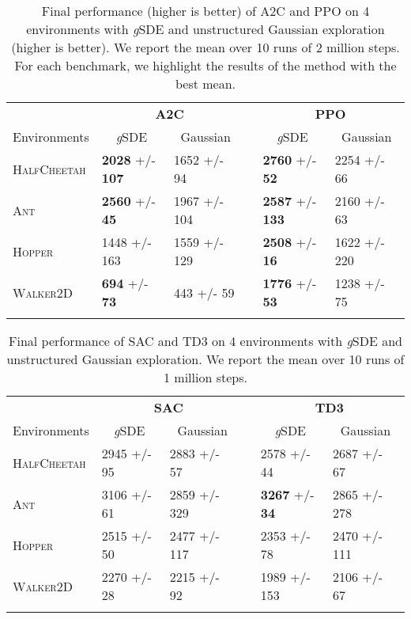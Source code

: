 \documentclass{article}
\newcommand{\ourSDE}{\textit{g}\textsc{SDE}\xspace}
\newcommand{\aac}{\textsc{A2C}\xspace}
\newcommand{\ppo}{\textsc{PPO}\xspace}
\newcommand{\sac}{\textsc{SAC}\xspace}
\newcommand{\tddd}{\textsc{TD3}\xspace}
\newcommand{\hc}{\textsc{HalfCheetah}\xspace}
\newcommand{\hopper}{\textsc{Hopper}\xspace}
\newcommand{\ant}{\textsc{Ant}\xspace}
\newcommand{\walker}{\textsc{Walker2D}\xspace}
\begin{document}
\begin{table}[h!]
\renewcommand{\arraystretch}{1.2}
\centering
\begin{tabular}{@{}l ll c ll@{}}

\toprule
 & \multicolumn{2}{c}{\textbf{\aac}} & \phantom{abc} & \multicolumn{2}{c}{\textbf{\ppo}} \\
 \cmidrule{2-3} \cmidrule{5-6}

 Environments & \multicolumn{1}{c}{\ourSDE} & \multicolumn{1}{c}{Gaussian} && \multicolumn{1}{c}{\ourSDE} &  \multicolumn{1}{c}{Gaussian} \\ \midrule
 \hc & \textbf{2028} +/- \textbf{107} & 1652 +/- 94 && \textbf{2760} +/- \textbf{52} & 2254 +/- 66 \\
 \ant & \textbf{2560} +/- \textbf{45} & 1967 +/- 104 && \textbf{2587} +/- \textbf{133} & 2160 +/- 63 \\
 \hopper & 1448 +/- 163 & 1559 +/- 129 && \textbf{2508} +/- \textbf{16} & 1622 +/- 220 \\
 \walker & \textbf{694} +/- \textbf{73} & 443 +/- 59 && \textbf{1776} +/- \textbf{53} & 1238 +/- 75 \\

\bottomrule \\
\end{tabular}

\caption{Final performance (higher is better) of \aac and \ppo on 4 environments with \ourSDE and unstructured Gaussian exploration (higher is better). We report the mean over 10 runs of 2 million steps.
For each benchmark, we highlight the results of the method with the best mean.
}
\label{tab:res-bullet-onpolicy}
\end{table}

\begin{table}[h!]
\renewcommand{\arraystretch}{1.2}
\centering
\begin{tabular}{@{}l ll c ll@{}}

\toprule
 & \multicolumn{2}{c}{\textbf{\sac}} & \phantom{abc} & \multicolumn{2}{c}{\textbf{\tddd}} \\
 \cmidrule{2-3} \cmidrule{5-6}

 Environments & \multicolumn{1}{c}{\ourSDE} & \multicolumn{1}{c}{Gaussian} && \multicolumn{1}{c}{\ourSDE}  &  \multicolumn{1}{c}{Gaussian} \\ \midrule
 \hc & 2945 +/- 95 & 2883 +/- 57 && 2578 +/- 44 & 2687 +/- 67 \\
 \ant & 3106 +/- 61 & 2859 +/- 329 && \textbf{3267} +/- \textbf{34} & 2865 +/- 278 \\
 \hopper & 2515 +/- 50 & 2477 +/- 117 && 2353 +/- 78 & 2470 +/- 111 \\
 \walker & 2270 +/- 28 & 2215 +/- 92 && 1989 +/- 153 & 2106 +/- 67 \\

\bottomrule \\
\end{tabular}

\caption{Final performance of \sac and \tddd on 4 environments with \ourSDE and unstructured Gaussian exploration. We report the mean over 10 runs of 1 million steps.
}
\label{tab:res-bullet-offpolicy}
\end{table}
\end{document}
